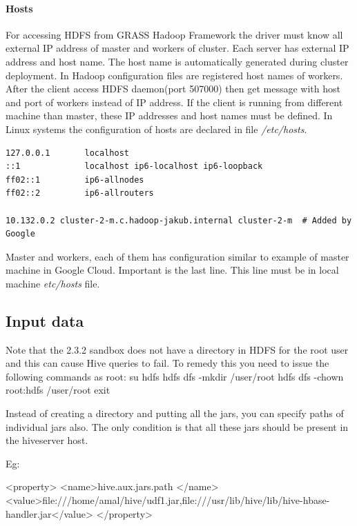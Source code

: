 \documentclass[a4paper,12pt,oneside]{report}
\begin{document}
\paragraph{Hosts} For accessing HDFS from GRASS Hadoop Framework the driver must know all external IP address of master and workers of cluster. Each server has external IP address and host name. The host name is automatically generated during cluster deployment. In Hadoop configuration files are registered host names of workers. After the client access HDFS daemon(port 507000) then get message with host and port of workers instead of IP address. If the client is running from different machine than master, these IP addresses and host names must be defined. In Linux systems the configuration of hosts  are declared in file \textit{/etc/hosts}. 
\begin{footnotesize}
\begin{lstlisting}[style=python]
127.0.0.1       localhost
::1             localhost ip6-localhost ip6-loopback
ff02::1         ip6-allnodes
ff02::2         ip6-allrouters

10.132.0.2 cluster-2-m.c.hadoop-jakub.internal cluster-2-m  # Added by Google
\end{lstlisting}
\end{footnotesize}
Master and workers, each of them has configuration similar to example of master machine in Google Cloud. Important is the  last line. This line must be in local machine \textit{etc/hosts} file.




\subsection{Input data}
Note that the 2.3.2 sandbox does not have a directory in HDFS for the root user and this can cause Hive queries to fail. To remedy this you need to issue the following commands as root:
su hdfs
hdfs dfs -mkdir /user/root
hdfs dfs -chown root:hdfs /user/root
exit
	




Instead of creating a directory and putting all the jars, you can specify paths of individual jars also. The only condition is that all these jars should be present in the hiveserver host.

Eg:

<property>
  <name>hive.aux.jars.path </name>
  <value>file:///home/amal/hive/udf1.jar,file:///usr/lib/hive/lib/hive-hbase-handler.jar</value>
</property>
	
\end{document}

